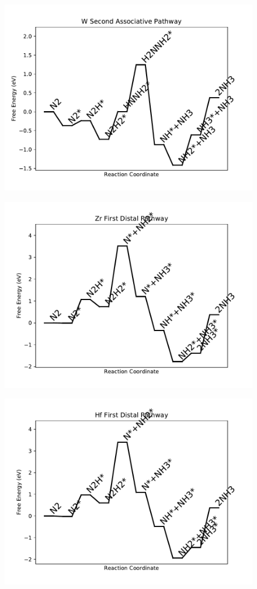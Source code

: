 \begin{figure}
\centering
\includegraphics[width=0.8\linewidth]{data/plots/W_associative_2.pdf}
\end{figure}

\begin{figure}
\centering
\includegraphics[width=0.8\linewidth]{data/plots/Zr_distal_1.pdf}
\end{figure}

\begin{figure}
\centering
\includegraphics[width=0.8\linewidth]{data/plots/Hf_distal_1.pdf}
\end{figure}


